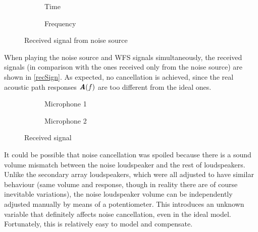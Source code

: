 \begin{figure}
	\begin{subfigure}[b]{0.49\textwidth}
		\centering
		\def\svgwidth{0.9\columnwidth}
		\graphicspath{{Img/}}
		{\fontsize{5}{12}\selectfont
			
		}
		\caption{Time}
	\end{subfigure}
	\begin{subfigure}[b]{0.49\textwidth}
		\centering
		\def\svgwidth{0.9\columnwidth}
		\graphicspath{{Img/}}
		{\fontsize{5}{12}\selectfont
			
		}
		\caption{Frequency}
	\end{subfigure}
	\caption{Received signal from noise source}
	\label{recNS}
\end{figure}

When playing the noise source and WFS signals simultaneously, the received signals (in comparison with the ones received only from the noise source) are shown in \autoref{recSign}. As expected, no cancellation is achieved, since the real acoustic path responses $\AcPath[mat](f)$ are too different from the ideal ones.
\begin{figure}[h]
	\begin{subfigure}[b]{0.49\textwidth}
		\centering
		\def\svgwidth{0.9\columnwidth}
		\graphicspath{{Img/}}
		{\fontsize{5}{12}\selectfont
			
		}
		\caption{Microphone 1}
	\end{subfigure}
	\begin{subfigure}[b]{0.49\textwidth}
		\centering
		\def\svgwidth{0.9\columnwidth}
		\graphicspath{{Img/}}
		{\fontsize{5}{12}\selectfont
			
		}
		\caption{Microphone 2}
	\end{subfigure}
	\caption{Received signal}
	\label{recSign}
\end{figure}

It could be possible that noise cancellation was spoiled because there is a sound volume mismatch between the noise loudspeaker and the rest of loudspeakers.
Unlike the secondary array loudspeakers, which were all adjusted to have similar behaviour (same volume and response, though in reality there are of course inevitable variations), the noise loudspeaker volume can be independently adjusted manually by means of a potentiometer.
This introduces an unknown variable that definitely affects noise cancellation, even in the ideal model. Fortunately, this is relatively easy to model and compensate.

